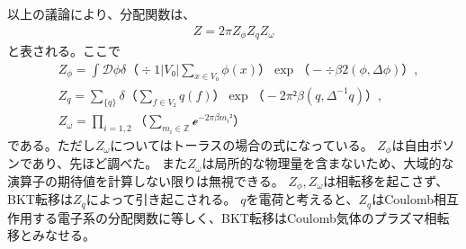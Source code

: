 \documentclass[12pt]{ltjsarticle}
\begin{document}
以上の議論により、分配関数は、
\begin{align}
    Z = 2𝜋 Z_ϕ Z_q Z_ω
\end{align}
と表される。ここで
\begin{align}&
    Z_ϕ = ∫ 𝒟ϕ δ（÷1{|V₀|} ∑_{x ∈ V₀} ϕ(x)） \exp（-÷{β}{2}(ϕ,Δϕ)）, \\
    &
    Z_q =  ∑_{\{q\}}δ（∑_{f ∈ V₂} q(f)）\exp（-2π²β(q,Δ^{-1}q)）, \\
    &
    Z_ω = ∏_{i=1,2}（∑_{m_i ∈ ℤ}ℯ^{-2πβ m_i²}）
\end{align}
である。ただし$Z_ω$についてはトーラスの場合の式になっている。
$Z_ϕ$は自由ボソンであり、先ほど調べた。
また$Z_ω$は局所的な物理量を含まないため、大域的な演算子の期待値を計算しない限りは無視できる。
$Z_ϕ, Z_ω$は相転移を起こさず、BKT転移は$Z_q$によって引き起こされる。
$q$を電荷と考えると、$Z_q$はCoulomb相互作用する電子系の分配関数に等しく、BKT転移はCoulomb気体のプラズマ相転移とみなせる。

\end{document}
